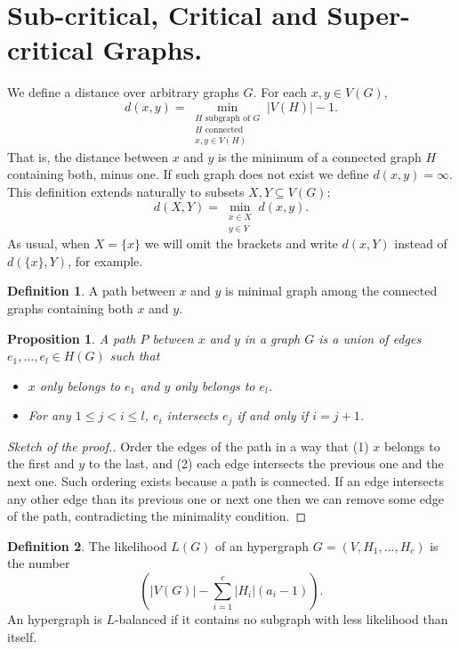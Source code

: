 \documentclass[11pt,notitlepage,a4paper]{article}
\newtheorem{proposition}{Proposition}[section]
\theoremstyle{definition}
\newtheorem{definition}{Definition}[section]
\begin{document}
\section{Sub-critical, Critical and Super-critical Graphs.}

We define a distance over arbitrary graphs $G$. For each $x, y\in V(G)$,
\[ d(x,y)= \min_{\substack{H \text{ subgraph of } G\\ 
H \text{ connected }\\
x,y\in V(H)}} |V(H)| - 1 .\]
That is, the distance between $x$ and $y$ is the minimum
of a connected graph $H$ containing both, minus one. 
If such graph does not exist we define $d(x,y)=\infty$.
This definition extends naturally to subsets $X,Y\subseteq V(G)$:
\[ d(X,Y)=\min_{\substack{x\in X\\ y\in Y}} d(x,y).\]
As usual, when $X=\{x\}$ we will omit the brackets and write
$d(x,Y)$ instead of $d(\{x\},Y)$, for example.  \par

\begin{definition} 
	A path between $x$ and $y$ is minimal graph among the connected graphs
	containing both $x$ and $y$. 
\end{definition}

\begin{proposition}\label{prop:pathform}
	A path $P$ between $x$ and $y$ in a graph $G$ is a union of 
	edges $e_1,\dots, e_l\in H(G)$ such that
	\begin{itemize}
		\item $x$ only belongs to
		$e_1$ and $y$ only belongs to $e_l$.
		\item For any $1\leq j < i\leq l$, $e_i$ intersects
		$e_j$ if and only if $i=j+1$.
	\end{itemize}  	
\end{proposition}
\begin{proof}[Sketch of the proof.]
	Order the edges of the path in a way that (1) $x$ belongs to the first and $y$ to the last, and
	(2) each edge intersects the previous one and the next one. Such ordering exists because a path is connected.
	If an edge intersects any other edge than its previous one or next one then we can remove some edge of the path,
	contradicting the minimality condition.
\end{proof}

\begin{definition}
	The likelihood $L(G)$ of an hypergraph $G=(V,H_1,\dots,H_c)$ is
	the number
	\[ \left( |V(G)| - \sum_{i=1}^c |H_i|(a_i-1)\right).\]
	An hypergraph is $L$-balanced if it contains no subgraph with
	less likelihood than itself. 
\end{definition}
\end{document}

